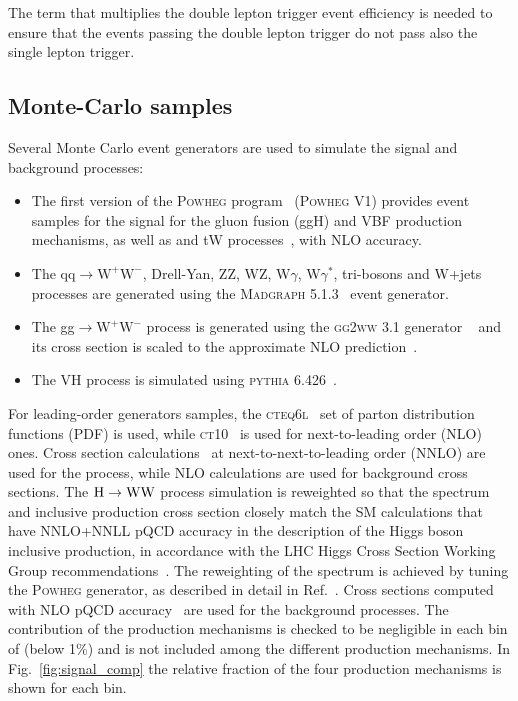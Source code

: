 The term that multiplies the double lepton trigger event efficiency is needed to ensure that the events passing the double lepton trigger do not pass also the single lepton trigger.

\subsection{Monte-Carlo samples\label{subsec:MC}}

Several Monte Carlo event generators are used to simulate the signal and background processes:
\begin{itemize}
\item The first version of the \textsc{Powheg} program~\cite{Kramer:2005hw,Frixione:2007vw,Lavesson:2008ah,Alioli:2008tz, Nason:2009ai} (\textsc{Powheg V1}) provides event samples for the \hww signal
for the gluon fusion (ggH) and VBF production mechanisms, as well as \ttbar and tW processes~\cite{Alioli:2011as}, with NLO accuracy.
\item The $\mathrm{qq} \to \mathrm{W^{+}W^{-}}$, Drell-Yan, ZZ, WZ, W$\gamma$, W$\gamma^*$, tri-bosons and W+jets processes are generated using
the \textsc{Madgraph 5.1.3}~\cite{Alwall:2014hca} event generator.
\item The gg$\to \mathrm{W^{+}W^{-}}$ process is generated using the \textsc{gg2ww} 3.1 generator ~\cite{Binoth:2006mf} and its cross section is scaled to the approximate NLO prediction~\cite{Bonvini:2013jha,Passarino:2013bha}.
\item The VH process is simulated using \textsc{pythia 6.426}~\cite{Sjostrand:2006za}.
\end{itemize}
For leading-order generators samples, the \textsc{cteq6l}~\cite{Lai:2010nw} set of parton distribution functions
(PDF) is used, while \textsc{ct10}~\cite{Lai:2010vv} is used for next-to-leading order (NLO) ones.
Cross section calculations~\cite{Dittmaier:2011ti} at next-to-next-to-leading order (NNLO) are used for the \hww process, while NLO calculations are used for background cross sections.
The ${\mathrm{H}\to\mathrm{WW}}$ process simulation is reweighted so that the \pth{} spectrum and inclusive production cross section closely match the SM calculations that have NNLO+NNLL pQCD accuracy in the description of the Higgs boson inclusive production, in accordance with the LHC Higgs Cross Section Working Group recommendations~\cite{Heinemeyer:2013tqa}.
The reweighting of the \pth{} spectrum is achieved by tuning the \textsc{Powheg} generator, as described in detail in Ref.~\cite{Alioli:2010xd}.
Cross sections computed with NLO pQCD accuracy~\cite{Heinemeyer:2013tqa} are used for the background processes.
The contribution of the \ttH production mechanisms is checked to be negligible in each bin of \pth (below 1\%) and is not included among the different production mechanisms. In Fig.~\ref{fig:signal_comp} the relative fraction of the four production mechanisms is shown for each \pth bin.

